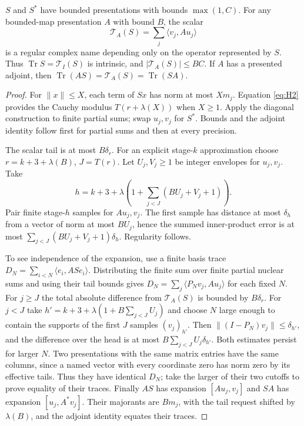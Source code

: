 \begin{theorem}
$S$ and $S^*$ have bounded presentations with bounds $\max(1,C)$.
For any bounded-map presentation $A$ with bound $B$, the scalar
\[
  \mathcal T_A(S)=\sum_j \langle v_j,A u_j\rangle
\]
is a regular complex name depending only on the operator represented by
$S$. Thus $\operatorname{Tr}S=\mathcal T_I(S)$ is intrinsic, and
$|\mathcal T_A(S)|\le BC$. If $A$ has a presented adjoint, then
$\operatorname{Tr}(AS)=\mathcal T_A(S)=\operatorname{Tr}(SA)$.
\end{theorem}
\begin{proof}
For $\|x\|\le X$, each term of $Sx$ has norm at most $Xm_j$.
Equation \eqref{eq:H2} provides the Cauchy modulus $T(r+\lambda(X))$
when $X\ge1$. Apply the diagonal construction to finite partial sums;
swap $u_j,v_j$ for $S^*$. Bounds and the adjoint identity follow first
for partial sums and then at every precision.

The scalar tail is at most $B\delta_r$. For an explicit stage-$k$
approximation choose $r=k+3+\lambda(B)$, $J=T(r)$.
Let $U_j,V_j\ge1$ be integer envelopes for $u_j,v_j$.
Take
\[
 h=k+3+\lambda\!\left(1+\sum_{j<J}(BU_j+V_j+1)\right).
\]
Pair finite stage-$h$ samples for $Au_j,v_j$. The first sample has
distance at most $\delta_h$ from a vector of norm at most $BU_j$, hence
the summed inner-product error is at most
$\sum_{j<J}(BU_j+V_j+1)\delta_h$. Regularity follows.

To see independence of the expansion, use a finite basis trace
$D_N=\sum_{i<N}\langle e_i,A S e_i\rangle$. Distributing the finite sum
over finite partial nuclear sums and using their tail bounds gives
$D_N=\sum_j\langle P_Nv_j,A u_j\rangle$ for each fixed $N$.
For $j\ge J$ the total absolute difference from $\mathcal T_A(S)$
is bounded by $B\delta_r$. For $j<J$ take
$h'=k+3+\lambda(1+B\sum_{j<J}U_j)$ and choose $N$ large enough
to contain the supports of the first $J$ samples $(v_j)_{h'}$.
Then $\|(I-P_N)v_j\|\le\delta_{h'}$, and the difference over the
head is at most $B\sum_{j<J}U_j\delta_{h'}$. Both estimates persist
for larger $N$. Two presentations with the same matrix entries have the
same columns, since a named vector with every coordinate zero has norm
zero by its effective tails. Thus they have identical $D_N$; take the
larger of their two cutoffs to prove equality of their traces. Finally
$AS$ has expansion $[Au_j,v_j]$ and $SA$ has expansion
$[u_j,A^*v_j]$. Their majorants are $Bm_j$, with the tail request shifted
by $\lambda(B)$, and the adjoint identity equates their traces.
\end{proof}

